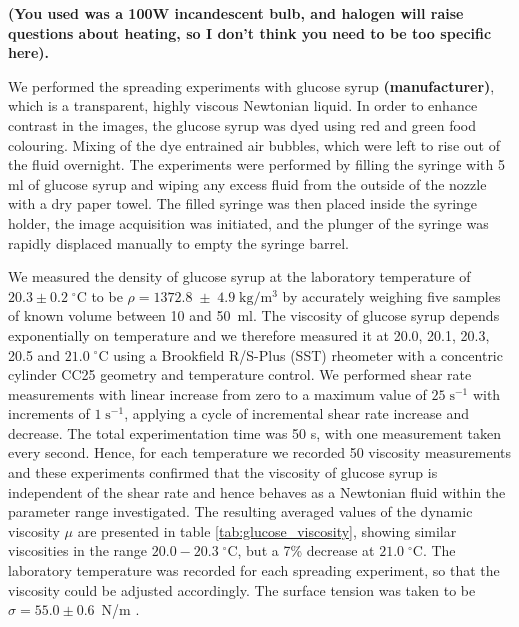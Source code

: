 \documentclass[aip,graphicx]{revtex4-1}
\newcommand{\sym}[1]{\text{#1}}
\newcommand{\degC}[1]{#1 \; ^{\circ} \text{C}}
\newcommand{\degCpm}[2]{#1 \pm #2 \; ^{\circ} \text{C}}
\begin{document}
{\bf (You used was a 100W incandescent bulb, and halogen will raise questions about heating, so I don't think you need to be too specific here).}

We performed the spreading experiments with glucose syrup {\bf (manufacturer)}, which is a transparent, highly viscous Newtonian liquid. In order to enhance contrast in the images, the glucose syrup was dyed using red and green food colouring. 
Mixing of the dye entrained air bubbles, which were left to rise out of the fluid overnight. The experiments were performed by filling the syringe with 5 ml of glucose syrup and wiping any excess fluid from the outside of the nozzle with a dry paper towel. The filled syringe was then placed inside the syringe holder, the image acquisition was initiated, and the plunger of the syringe was rapidly displaced manually to empty the syringe barrel.

We measured the density of glucose syrup at the laboratory temperature of $\degCpm{20.3}{0.2}$ to be  $\rho=1372.8 \; \pm \; 4.9 \; \sym{kg}/\sym{m}^3$ by accurately weighing five samples of known volume between 10 and 50~ml.
The viscosity of glucose syrup depends exponentially on temperature \cite{llewellin2002rheology} and we therefore measured it at 20.0, 20.1, 20.3, 20.5 and $\degC{21.0}$ using a Brookfield R/S-Plus (SST) rheometer with a concentric cylinder CC25 geometry and temperature control. We performed shear rate measurements with linear increase from zero to a maximum value of $25 \; \sym{s}^{-1}$ with increments of $1 \; \sym{s}^{-1}$, applying a cycle of incremental shear rate increase and decrease. 
The total experimentation time was 50 s, with one measurement taken every second. Hence, for each temperature we recorded 50 viscosity measurements and these experiments confirmed that the viscosity of glucose syrup is independent of the shear rate and hence behaves as a Newtonian fluid within the parameter range investigated. The resulting averaged values of the dynamic viscosity $\mu$ are presented in table \ref{tab:glucose_viscosity}, showing similar viscosities in the range $20.0 - \degC{20.3}$, but a 7\% decrease at $\degC{21.0}$. The laboratory temperature was recorded for each spreading experiment, so that the viscosity could be adjusted accordingly. The surface tension was taken to be $\sigma=55.0 \pm 0.6$~N/m \cite{montanez2013influence}.
\end{document}

